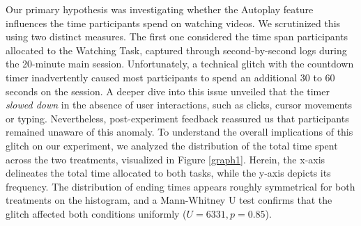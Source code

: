 \documentclass[11pt,a4paper,oneside]{article}
\begin{document}

Our primary hypothesis was investigating whether the Autoplay feature influences the time participants spend on watching videos. We scrutinized this using two distinct measures. The first one considered the time span participants allocated to the Watching Task, captured through second-by-second logs during the 20-minute main session. Unfortunately, a technical glitch with the countdown timer inadvertently caused most participants to spend an additional 30 to 60 seconds on the session. A deeper dive into this issue unveiled that the timer \textit{slowed down} in the absence of user interactions, such as clicks, cursor movements or typing. Nevertheless, post-experiment feedback reassured us that participants remained unaware of this anomaly. To understand the overall implications of this glitch on our experiment, we analyzed the distribution of the total time spent across the two treatments, visualized in Figure \ref{graph1}. Herein, the x-axis delineates the total time allocated to both tasks, while the y-axis depicts its frequency.  The distribution of ending times appears roughly symmetrical for both treatments on the histogram, and a Mann-Whitney U test confirms that the glitch affected both conditions uniformly ($U=6331, p=0.85$).
\end{document}
